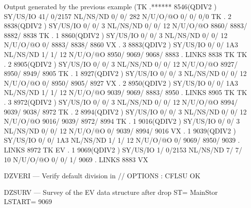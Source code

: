 \begin{landscapebody}
\begin{XMPt}{Output generated by the previous example}
(TK  .******     8546(QDIV2   ) SY/US/IO   41/    0/2157 NL/NS/ND    0/    0/     282 N/U/O/@O       0/       0/       0/0       
 TK  .     2     8838(QDIV2   ) SY/US/IO    0/    0/   3 NL/NS/ND    0/    0/      12 N/U/O/@O    8860/    8883/    8882/    8838
 TK  .     1     8860(QDIV2   ) SY/US/IO    0/    0/   3 NL/NS/ND    0/    0/      12 N/U/O/@O       0/    8883/    8838/    8860
 VX  .     3     8883(QDIV2   ) SY/US/IO    0/    0/ 1A3 NL/NS/ND    1/    1/      12 N/U/O/@O    8950/    9069/    9068/    8883
     . LINKS      8838 TK                                                                                                        
 TK  .     2     8905(QDIV2   ) SY/US/IO    0/    0/   3 NL/NS/ND    0/    0/      12 N/U/O/@O    8927/    8950/    8949/    8905
 TK  .     1     8927(QDIV2   ) SY/US/IO    0/    0/   3 NL/NS/ND    0/    0/      12 N/U/O/@O       0/    8950/    8905/    8927
 VX  .     2     8950(QDIV2   ) SY/US/IO    0/    0/ 1A3 NL/NS/ND    1/    1/      12 N/U/O/@O    9039/    9069/    8883/    8950
     . LINKS      8905 TK                                                                                                        
 TK  .     3     8972(QDIV2   ) SY/US/IO    0/    0/   3 NL/NS/ND    0/    0/      12 N/U/O/@O    8994/    9039/    9038/    8972
 TK  .     2     8994(QDIV2   ) SY/US/IO    0/    0/   3 NL/NS/ND    0/    0/      12 N/U/O/@O    9016/    9039/    8972/    8994
 TK  .     1     9016(QDIV2   ) SY/US/IO    0/    0/   3 NL/NS/ND    0/    0/      12 N/U/O/@O       0/    9039/    8994/    9016
 VX  .     1     9039(QDIV2   ) SY/US/IO    0/    0/ 1A3 NL/NS/ND    1/    1/      12 N/U/O/@O       0/    9069/    8950/    9039
     . LINKS      8972 TK                                                                                                        
 EV  .     1     9069(QDIV2   ) SY/US/IO    1/    0/2153 NL/NS/ND    7/    7/      10 N/U/O/@O       0/       0/       1/    9069
     . LINKS      8883 VX                                                                                                        
                                                                                                                                 
DZVERI --- Verify default division in //                                                           OPTIONS : CFLSU          OK   
                                                                                                                                 
DZSURV --- Survey of the EV data structure after drop                                              ST= MainStor  LSTART=     9069
                                                                                                                                 

\end{XMPt}
\end{landscapebody}
